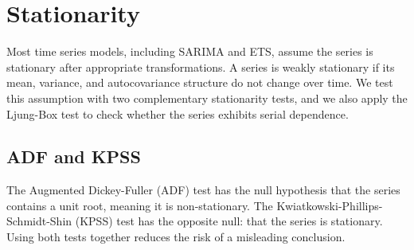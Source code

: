 \documentclass[
  english,
  a4paper,
]{article}
\begin{document}
\section{Stationarity}\label{stationarity}

Most time series models, including SARIMA and ETS, assume the series is
stationary after appropriate transformations. A series is weakly
stationary if its mean, variance, and autocovariance structure do not
change over time. We test this assumption with two complementary
stationarity tests, and we also apply the Ljung-Box test to check
whether the series exhibits serial dependence.

\subsection{ADF and KPSS}\label{adf-and-kpss}

The Augmented Dickey-Fuller (ADF) test has the null hypothesis that the
series contains a unit root, meaning it is non-stationary. The
Kwiatkowski-Phillips-Schmidt-Shin (KPSS) test has the opposite null:
that the series is stationary. Using both tests together reduces the
risk of a misleading conclusion.
\end{document}
